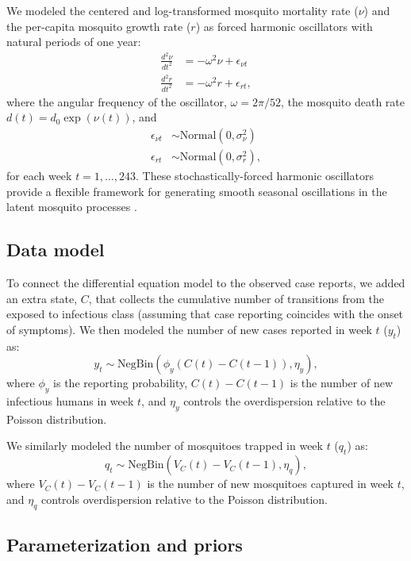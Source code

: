 \documentclass[10pt,letterpaper]{article}
\begin{document}
We modeled the centered and log-transformed mosquito mortality rate ($\nu$) and the per-capita mosquito growth rate ($r$) as forced harmonic oscillators with natural periods of one year:
\begin{align}
\frac{d^2\nu}{dt^2} &= -\omega^2 \nu + \epsilon_{\nu t}\\
\frac{d^2 r}{dt^2} &= -\omega^2 r + \epsilon_{rt},
\end{align}
where the angular frequency of the oscillator, $\omega = 2\pi / 52$, the mosquito death rate $d(t) = d_0 \exp(\nu(t))$, and
\begin{align}
\epsilon_{\nu t} & \sim \text{Normal}(0, \sigma^2_{\nu})\\
\epsilon_{rt} & \sim \text{Normal}(0, \sigma^2_r),
\end{align}
for each week $t = 1, \dots, 243$.
These stochastically-forced harmonic oscillators provide a flexible framework for generating smooth seasonal oscillations in the latent mosquito processes \cite{Ramsay2017}.

\subsection*{Data model}

To connect the differential equation model to the observed case reports, we added an extra state, $C$, that collects the cumulative number of transitions from the exposed to infectious class (assuming that case reporting coincides with the onset of symptoms).
We then modeled the number of new cases reported in week $t$ ($y_t$) as:
\begin{equation}
y_t  \sim \text{NegBin}(\phi_y (C(t) - C(t-1)), \eta_y),
\end{equation}
where $\phi_y$ is the reporting probability, $C(t) - C(t-1)$ is the number of new infectious humans in week $t$, and $\eta_y$ controls the overdispersion relative to the Poisson distribution.

We similarly modeled the number of mosquitoes trapped in week $t$ ($q_t$) as:
\begin{equation}
q_t \sim \text{NegBin}(V_{C}(t) - V_{C}(t-1), \eta_q),
\end{equation}
where $V_{C}(t) - V_{C}(t-1)$ is the number of new mosquitoes captured in week $t$, and $\eta_q$ controls overdispersion relative to the Poisson distribution.

\subsection*{Parameterization and priors}
\end{document}
